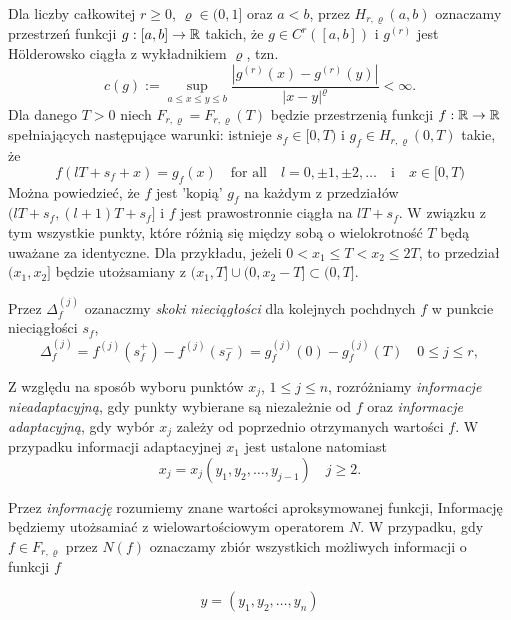 \documentclass[oik, pdftex, robocza, man]{mgrwms}
\begin{document}
Dla liczby całkowitej $ r \geq 0$, $\varrho \in (0,1]$ oraz $a < b$, przez $H_{r, \varrho}(a,b)$ oznaczamy przestrzeń funkcji $g: [a,b] \rightarrow \mathbb{R}$ takich, że $g \in C^r([a, b])$ i $g^{(r)}$ jest Hölderowsko ciągła z wykładnikiem $\varrho$, tzn.
\begin{equation*}
    c(g) := \sup_{a \leq x \leq y \leq b} \frac{|g^{(r)}(x) - g^{(r)}(y)|}{|x-y|^{\varrho}} < \infty.
\end{equation*}
Dla danego $T > 0$ niech $F_{r, \varrho} = F_{r, \varrho}(T)$ będzie przestrzenią funkcji $f: \mathbb{R} \rightarrow \mathbb{R}$ spełniających następujące warunki: istnieje $s_f \in [0, T)$ i $g_f \in H_{r, \varrho}(0,T)$ takie, że
\begin{equation*}
    f(lT + s_f + x) = g_f(x) \quad \text{for all} \quad l = 0, \pm 1, \pm 2, \ldots \quad \text{i} \quad x \in [0, T)
\end{equation*}
Można powiedzieć, że $f$ jest 'kopią' $g_f$ na każdym z przedziałów $(lT + s_f, (l + 1)T + s_f]$ i $f$ jest prawostronnie ciągła na $lT + s_f$. W związku z tym wszystkie punkty, które różnią się między sobą o wielokrotność $T$ będą uważane za identyczne. Dla przykładu, jeżeli $0 < x_1 \leq T < x_2 \leq 2T$, to przedział $(x_1, x_2]$ będzie utożsamiany z $(x_1,T] \cup (0, x_2 - T] \subset (0, T]$.

Przez $\Delta_f^{(j)}$ ozanaczmy \emph{skoki nieciągłości} dla kolejnych pochdnych $f$ w punkcie nieciągłości $s_f$,
\begin{equation*}
    \Delta_f^{(j)} = f^{(j)}(s_f^+) - f^{(j)}(s_f^-) = g_f^{(j)}(0) - g_f^{(j)}(T) \quad 0 \leq j \leq r,
\end{equation*}

Z względu na sposób wyboru punktów $x_j$, $1 \leq j \leq n$, rozróżniamy \textit{informacje nieadaptacyjną}, gdy punkty wybierane są niezależnie od $f$ oraz \textit{informacje adaptacyjną}, gdy wybór $x_j$ zależy od poprzednio otrzymanych wartości $f$. W przypadku informacji adaptacyjnej $x_1$ jest ustalone natomiast
\begin{equation*}
    x_j = x_j(y_1, y_2, \ldots, y_{j-1}) \quad j \geq 2.
\end{equation*}

Przez \textit{informację} rozumiemy znane wartości aproksymowanej funkcji, Informację będziemy utożsamiać z wielowartościowym operatorem $N$. W przypadku, gdy $f \in F_{r, \varrho}$ przez $N(f)$ oznaczamy zbiór wszystkich możliwych informacji o funkcji $f$

\begin{equation*}
    y = (y_{1}, y_{2}, \dots, y_{n})
\end{equation*}
\end{document}
